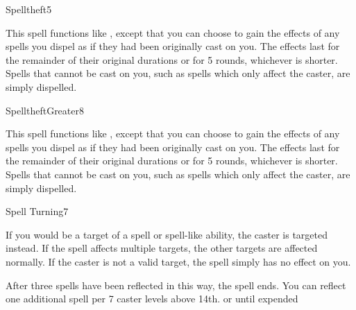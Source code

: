 \begin{spellsection}{Spelltheft}{5}
\begin{spellheader}
\end{spellheader}
\begin{spellcontent}
    \spellspecial This spell functions like , except that you can choose to gain the effects of any spells you dispel as if they had been originally cast on you. The effects last for the remainder of their original durations or for 5 rounds, whichever is shorter. Spells that cannot be cast on you, such as spells which only affect the caster, are simply dispelled.
\end{spellcontent}
\begin{spellfooter}
\end{spellfooter}
\end{spellsection}

\begin{spellsection}{Spelltheft}{Greater}{8}
\begin{spellheader}
\end{spellheader}
\begin{spellcontent}
    \spellspecial This spell functions like , except that you can choose to gain the effects of any spells you dispel as if they had been originally cast on you. The effects last for the remainder of their original durations or for 5 rounds, whichever is shorter. Spells that cannot be cast on you, such as spells which only affect the caster, are simply dispelled.
\end{spellcontent}
\begin{spellfooter}
\end{spellfooter}
\end{spellsection}

\begin{spellsection}{Spell Turning}{7}
\begin{spellheader}
    \begin{spelltargetinginfo}
    \end{spelltargetinginfo}
\end{spellheader}
\begin{spellcontent}
    \begin{spelleffects}
        \spelleffect If you would be a target of a spell or spell-like ability, the caster is targeted instead. If the spell affects multiple targets, the other targets are affected normally. If the caster is not a valid target, the spell simply has no effect on you.

        After three spells have been reflected in this way, the spell ends. You can reflect one additional spell per 7 caster levels above 14th.
        \spelldur \durlong or until expended
    \end{spelleffects}
\end{spellcontent}
\begin{spellfooter}
\end{spellfooter}
\end{spellsection}

